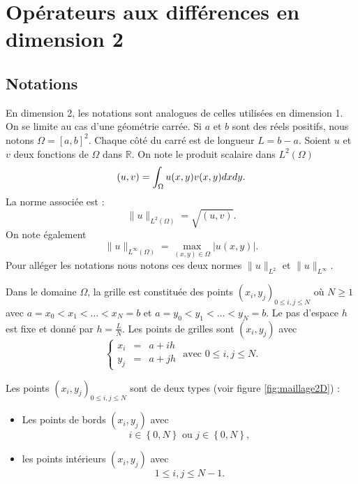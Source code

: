 \section{Opérateurs aux différences en dimension 2}


\subsection{Notations}
\label{sec:notation_2D}

En dimension 2, les notations sont analogues de celles utilisées en dimension 1. On se limite au cas d'une géométrie carrée. Si $a$ et $b$ sont des réels positifs, nous notons $\Omega = [a,b]^2$. Chaque côté du carré est de longueur $L=b-a$. 
Soient $u$ et $v$ deux fonctions de $\Omega$ dans $\mathbb{R}$. On note le produit scalaire dans $L^2 ( \Omega )$
\begin{equation}
(u,v) = \displaystyle\int_{\Omega} u(x,y) v(x,y) dx dy.
\end{equation}
La norme associée est :
\begin{equation}
\| u \|_{L^2(\Omega)} = \sqrt{(u,v)}. 
\end{equation}
On note également
\begin{equation}
\| u \|_{L^{\infty} ( \Omega )} = \max_{(x,y) \in \Omega} |u(x,y)|.
\end{equation}
Pour alléger les notations nous notons ces deux normes $\| u \|_{L^2}$ et $\| u \|_{L^{\infty}}$.

Dans le domaine $\Omega$, la grille est constituée des points $(x_i,y_j)_{0 \leq i,j \leq N}$ où $N \geq 1$ avec $a = x_0 < x_1 < \ldots < x_N = b$ et $a = y_0 < y_1 < \ldots < y_N = b$. Le pas d'espace $h$ est fixe et donné par $h = \frac{L}{N}$. Les points de grilles sont $(x_i, y_j)$ avec 
\begin{equation}
\left\lbrace\begin{array}{rcl}
x_i & = & a + i h \\
y_j & = & a + j h 
\end{array}\right. \text{ avec } 0 \leq i,j \leq N.
\end{equation}

Les points $(x_i,y_j)_{0 \leq i,j \leq N}$ sont de deux types (voir figure \ref{fig:maillage2D}) :
\begin{itemize}
\item Les points de bords $(x_i, y_j)$ avec
\begin{equation}
i \in \left\lbrace 0 , N \right\rbrace \text{ ou } j \in \left\lbrace 0 , N \right\rbrace,
\end{equation}
\item les points intérieurs $(x_i, y_j)$ avec
\begin{equation}
1 \leq i,j \leq N-1.
\end{equation}
\end{itemize}



